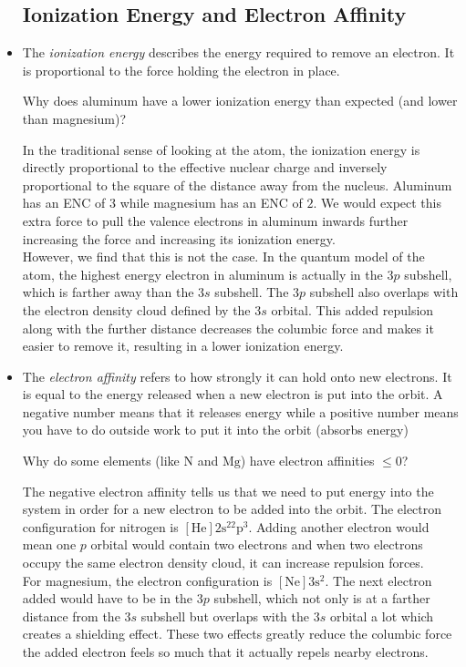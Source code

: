 \documentclass{article}
\numberwithin{equation}{section}
\theoremstyle{classic}
\begin{document}
\begin{itemize}
    \subsection{Ionization Energy and Electron Affinity}
    \item The \textit{ionization energy} describes the energy required to remove an electron. It is proportional to the force holding the electron in place.
    \begin{exampleQ}
        Why does aluminum have a lower ionization energy than expected (and lower than magnesium)?
    \end{exampleQ}
    \begin{exampleS}
        In the traditional sense of looking at the atom, the ionization energy is directly proportional to the effective nuclear charge and inversely proportional to the square of the distance away from the nucleus. Aluminum has an ENC of $3$ while magnesium has an ENC of $2$. We would expect this extra force to pull the valence electrons in aluminum inwards further increasing the force and increasing its ionization energy.\\

        However, we find that this is not the case. In the quantum model of the atom, the highest energy electron in aluminum is actually in the $3p$ subshell, which is farther away than the $3s$ subshell. The $3p$ subshell also overlaps with the electron density cloud defined by the $3s$ orbital. This added repulsion along with the further distance decreases the columbic force and makes it easier to remove it, resulting in a lower ionization energy.
    \end{exampleS}
    \item The \textit{electron affinity} refers to how strongly it can hold onto new electrons. It is equal to the energy released when a new electron is put into the orbit. A negative number means that it releases energy while a positive number means you have to do outside work to put it into the orbit (absorbs energy)
    \begin{exampleQ}
        Why do some elements (like $\mathrm{N}$ and $\mathrm{Mg}$) have electron affinities $\le 0$?
    \end{exampleQ}
    \begin{exampleS}
        The negative electron affinity tells us that we need to put energy into the system in order for a new electron to be added into the orbit. The electron configuration for nitrogen is $\mathrm{[He]2s^22p^3}$. Adding another electron would mean one $p$ orbital would contain two electrons and when two electrons occupy the same electron density cloud, it can increase repulsion forces. \\

        For magnesium, the electron configuration is $\mathrm{[Ne]3s^2}$. The next electron added would have to be in the $3p$ subshell, which not only is at a farther distance from the $3s$ subshell but overlaps with the $3s$ orbital a lot which creates a shielding effect. These two effects greatly reduce the columbic force the added electron feels so much that it actually repels nearby electrons.
    \end{exampleS}
\end{itemize}
\end{document}
